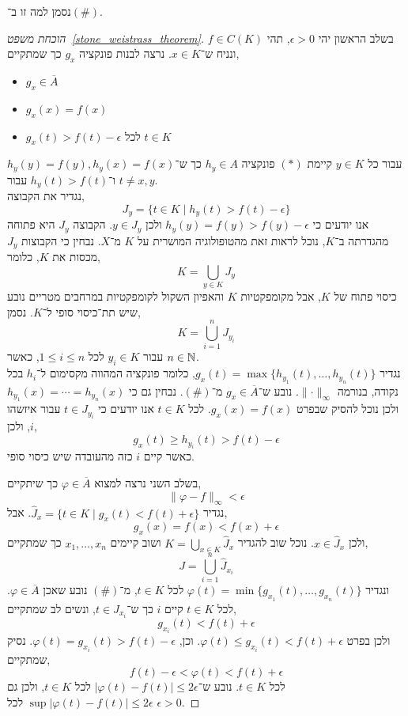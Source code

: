 נסמן למה זו ב־$(\#)$.
\begin{proof}[הוכחת משפט\ \ref{stone_weistrass_theorem}]
	בשלב הראשון יהי $\epsilon > 0$, תהי $f \in C(K)$ ונניח ש־$x \in K$.
	נרצה לבנות פונקציה $g_x$ כך שמתקיים,
	\begin{itemize}
		\item $g_x \in \overline{A}$
		\item $g_x(x) = f(x)$
		\item $g_x(t) > f(t) - \epsilon$ לכל $t \in K$
	\end{itemize}
	עבור כל $y \in K$ קיימת $(*)$ פונקציה $h_y \in A$ כך ש־$h_y(y) = f(y), h_y(x) = f(x)$ ו־$h_y(t) > f(t)$ עבור $t \ne x, y$. \\
	נגדיר את הקבוצה,
	\[
		J_y
		= \{ t \in K \mid h_y(t) > f(t) - \epsilon \}
	\]
	אנו יודעים כי $h_y(y) = f(y) > f(y) - \epsilon$ ולכן $y \in J_y$.
	הקבוצה $J_y$ היא פתוחה מהגדרתה ב־$K$, נוכל לראות זאת מהטופולוגיה המושרית על $K$ מ־$X$.
	נבחין כי הקבוצות $J_y$ מכסות את $K$, כלומר,
	\[
		K
		= \bigcup_{y \in K} J_y
	\]
	כיסוי פתוח של $K$, אבל מקומפקטיות $K$ והאפיון השקול לקומפקטיות במרחבים מטריים נובע שיש תת־כיסוי סופי ל־$K$.
	נסמן,
	\[
		K = \bigcup_{i = 1}^n J_{y_i}
	\]
	עבור $y_i \in K$ לכל $1 \le i \le n$, כאשר $n \in \mathbb{N}$. \\
	נגדיר $g_x(t) = \max\{ h_{y_1}(t), \ldots, h_{y_n}(t) \}$, כלומר פונקציה המהווה מקסימום ל־$h_i$ בכל נקודה, בנורמה $\lVert \cdot \rVert_\infty$.
	נובע ש־$g_x \in \overline{A}$ מ־$(\#)$.
	נבחין גם כי $h_{y_1}(x) = \cdots = h_{y_n}(x)$ ולכן נוכל להסיק שבפרט $g_x(x) = f(x)$.
	לכל $t \in K$ אנו יודעים כי $t \in J_{y_i}$ עבור איזשהו $i$, ולכן,
	\[
		g_x(t)
		\ge h_{y_i}(t)
		> f(t) - \epsilon
	\]
	כאשר קיים $i$ כזה מהעובדה שיש כיסוי סופי.

	בשלב השני נרצה למצוא $\varphi \in \overline{A}$ כך שיתקיים,
	\[
		\lVert \varphi - f \rVert_\infty < \epsilon
	\]
	נגדיר $\hat{J}_x = \{ t \in K \mid g_x(t) < f(t) + \epsilon \}$.
	אבל,
	\[
		g_x(x)
		= f(x)
		< f(x) + \epsilon
	\]
	ולכן $x \in \hat{J}_x$.
	נוכל שוב להגדיר $K = \bigcup_{x \in K} \hat{J}_x$ ושוב קיימים $x_1, \ldots, x_n$ כך שמתקיים,
	\[
		J
		= \bigcup_{i = 1}^n \hat{J}_{x_i}
	\]
	ונגדיר $\varphi(t) = \min\{ g_{x_1}(t), \ldots, g_{x_n}(t) \}$ לכל $t \in K$, מ־$(\#)$ נובע שאכן $\varphi \in \overline{A}$.
	לכל $t \in K$ קיים $i$ כך ש־$t \in \hat{J}_{x_i}$, ונשים לב שמתקיים,
	\[
		g_{x_i}(t)
		< f(t) + \epsilon
	\]
	ולכן בפרט $\varphi(t) \le g_{x_i}(t) < f(t) + \epsilon$.
	וכן, $\varphi(t) = g_{x_i}(t) > f(t) - \epsilon$.
	נסיק שמתקיים,
	\[
		f(t) - \epsilon
		< \varphi(t)
		< f(t) + \epsilon
	\]
	לכל $t \in K$.
	נובע ש־$|\varphi(t) - f(t)| \le 2 \epsilon$ לכל $t \in K$, ולכן גם $\sup |\varphi(t) - f(t)| \le 2 \epsilon$ לכל $\epsilon > 0$.
\end{proof}

